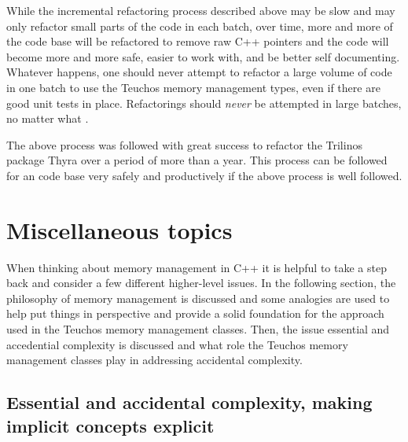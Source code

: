 \documentclass[pdf,ps2pdf,11pt]{SANDreport}
\begin{document}
While the incremental refactoring process described above may be slow
and may only refactor small parts of the code in each batch, over
time, more and more of the code base will be refactored to remove raw
C++ pointers and the code will become more and more safe, easier to
work with, and be better self documenting.  Whatever happens, one
should never attempt to refactor a large volume of code in one batch
to use the Teuchos memory management types, even if there are good
unit tests in place.  Refactorings should {}\textit{never} be
attempted in large batches, no matter what
{}\cite{WorkingEffectivelyWithLegacyCode05}.

The above process was followed with great success to refactor the
Trilinos package Thyra over a period of more than a year.  This
process can be followed for an code base very safely and productively
if the above process is well followed.


%
{}\section{Miscellaneous topics}
\label{sec:misc-topics}
%

When thinking about memory management in C++ it is helpful to take a
step back and consider a few different higher-level issues.  In the
following section, the philosophy of memory management is discussed
and some analogies are used to help put things in perspective and
provide a solid foundation for the approach used in the Teuchos memory
management classes.  Then, the issue essential and accedential
complexity is discussed and what role the Teuchos memory management
classes play in addressing accidental complexity.


%
{}\subsection{Essential and accidental complexity, making implicit
concepts explicit}
\label{sec:essentail-accidental-complexity}
%
\end{document}
